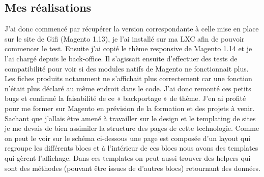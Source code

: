 \documentclass[a4paper,11pt,twoside]{report}
\begin{document}
    \subsection*{Mes réalisations}
    J'ai donc commencé par récupérer la version correspondante à celle mise en place sur le site de Gifi (Magento 1.13), je l'ai installé sur ma LXC afin de pouvoir commencer le test. Ensuite j'ai copié le thème responsive de Magento 1.14 et je l'ai chargé depuis le back-office. Il s'agissait ensuite d'effectuer des tests de compatibilité pour voir si des modules natifs de Magento ne fonctionnait plus. Les fiches produits notamment ne s'affichait plus correctement car une fonction n'était plus déclaré au même endroit dans le code. J'ai donc remonté ces petits bugs et confirmé la faisabilité de ce « backportage » de thème. J'en ai profité pour me former sur Magento en prévision de la formation et des projets à venir. Sachant que j'allais être amené à travailler sur le design et le templating de sites je me devais de bien assimiler la structure des pages de cette technologie. Comme on peut le voir sur le schéma ci-dessous une page est composée d'un layout qui regroupe les différents blocs et à l'intérieur de ces blocs nous avons des templates qui gèrent l'affichage. Dans ces templates on peut aussi trouver des helpers qui sont des méthodes (pouvant être issues de d'autres blocs) retournant des données.
    
\end{document}
